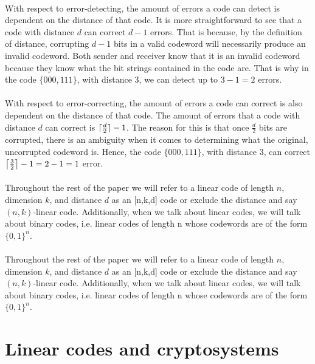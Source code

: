 \documentclass{article}
\DeclarePairedDelimiter{\ceil}{\lceil}{\rceil}
\theoremstyle{definition}
\begin{document}
\paragraph{} With respect to error-detecting, the amount of errors a code can detect is dependent on the distance of that code.  It is more straightforward to see that a code with distance $d$ can correct $d-1$ errors.  That is because, by the definition of distance, corrupting $d-1$ bits in a valid codeword will necessarily produce an invalid codeword.  Both sender and receiver know that it is an invalid codeword because they know what the bit strings contained in the code are.  That is why in the code $\{000,111\}$, with distance 3, we can detect up to $3-1 = 2$ errors.  

\paragraph{} With respect to error-correcting, the amount of errors a code can correct is also dependent on the distance of that code.  The amount of errors that a code with distance $d$ can correct is $\ceil[\bigcap]{\frac{d}{2}} - 1$.  The reason for this is that once $\frac{d}{2}$ bits are corrupted, there is an ambiguity when it comes to determining what the original, uncorrupted codeword is.  Hence, the code $\{000,111\}$, with distance 3, can correct $\ceil[\big]{\frac{3}{2}}-1 = 2-1 = 1$ error.

\paragraph{} Throughout the rest of the paper we will refer to a linear code of length $n$, dimension $k$, and distance $d$ as an [n,k,d] code or exclude the distance and say $(n,k)$-linear code.  Additionally, when we talk about linear codes, we will talk about binary codes, i.e. linear codes of length n whose codewords are of the form $\{0,1\}^n$. 


\paragraph{} Throughout the rest of the paper we will refer to a linear code of length $n$, dimension $k$, and distance $d$ as an [n,k,d] code or exclude the distance and say $(n,k)$-linear code.  Additionally, when we talk about linear codes, we will talk about binary codes, i.e. linear codes of length n whose codewords are of the form $\{0,1\}^n$. 

\section{Linear codes and cryptosystems}
\end{document}
